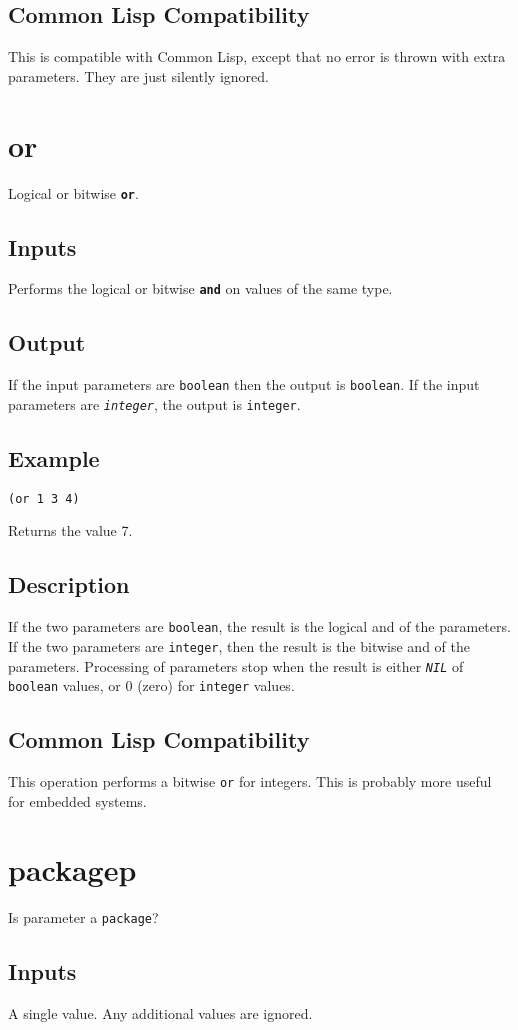 \documentclass[10pt, openany]{book}
\newcommand{\operation}[1]{\textbf{\texttt{#1}}}
\newcommand{\constant}[1]{\emph{\texttt{#1}}}
\newcommand{\keyword}[1]{\texttt{#1}}
\newcommand{\datatype}[1]{\texttt{#1}}
\newcommand{\cl}{Common Lisp}
\begin{document}
\subsection{Common Lisp Compatibility}
This is compatible with \cl, except that no error is thrown with extra parameters.  They are just silently ignored.

\section{or}
Logical or bitwise \operation{or}.
\subsection{Inputs}
Performs the logical or bitwise \operation{and} on values of the same type.
\subsection{Output}
If the input parameters are \datatype{boolean} then the output is \datatype{boolean}.  If the input parameters are \constant{integer}, the output is \datatype{integer}.
\subsection{Example}
\begin{lstlisting}
(or 1 3 4)
\end{lstlisting}
Returns the value 7.
\subsection{Description}
If the two parameters are \datatype{boolean}, the result is the logical and of the parameters.  If the two parameters are \datatype{integer}, then the result is the bitwise and of the parameters.  Processing of parameters stop when the result is either \constant{NIL} of \datatype{boolean} values, or 0 (zero) for \datatype{integer} values.
\subsection{Common Lisp Compatibility}
This operation performs a bitwise \keyword{or} for integers.  This is probably more useful for embedded systems.

\section{packagep}
Is parameter a \datatype{package}?
\subsection{Inputs}
A single value.  Any additional values are ignored.
\end{document}
